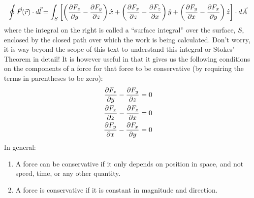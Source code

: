 \begin{align*}
\oint \vec F(\vec r) \cdot d\vec l = \int_S \left[\left(\frac{\partial F_z}{\partial y}-\frac{\partial F_y}{\partial z}\right)\hat x+ \left(\frac{\partial F_x}{\partial z}-\frac{\partial F_z}{\partial x}\right)\hat y + \left(\frac{\partial F_y}{\partial x}-\frac{\partial F_x}{\partial y}\right)\hat z \right]\cdot d\vec A
\end{align*}
where the integral on the right is called a ``surface integral'' over the surface, $S$, enclosed by the closed path over which the work is being calculated. Don't worry, it is way beyond the scope of this text to understand this integral or Stokes' Theorem in detail! It is however useful in that it gives us the following conditions on the components of a force for that force to be conservative (by requiring the terms in parentheses to be zero):
\begin{align}
\label{eq:potentialecons:conservative}
\frac{\partial F_z}{\partial y}-\frac{\partial F_y}{\partial z} &= 0 \nonumber\\
\frac{\partial F_x}{\partial z}-\frac{\partial F_z}{\partial x} &= 0\nonumber\\
\frac{\partial F_y}{\partial x}-\frac{\partial F_x}{\partial y} &= 0
\end{align}
In general:
\begin{enumerate}
\item A force can be conservative if it only depends on position in space, and not speed, time, or any other quantity.
\item A force is conservative if it is constant in magnitude and direction.
\end{enumerate}


